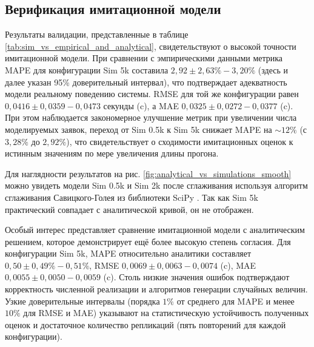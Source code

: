 \documentclass[12pt,a4paper]{article}
\begin{document}
\subsection{Верификация имитационной модели}

Результаты валидации, представленные в таблице \ref{tab:sim_vs_empirical_and_analytical}, свидетельствуют о высокой точности имитационной модели. При сравнении с эмпирическими данными метрика MAPE для конфигурации Sim 5k составила $2,92 \pm 2,63\%-3,20\%$ (здесь и далее указан 95\% доверительный интервал), что подтверждает адекватность модели реальному поведению системы. RMSE для той же конфигурации равен $0,0416 \pm 0,0359-0,0473$ секунды (c), а MAE $0,0325 \pm 0,0272-0,0377$ (c). При этом наблюдается закономерное улучшение метрик при увеличении числа моделируемых заявок, переход от Sim 0.5k к Sim 5k снижает MAPE на $\sim12\%$ (с $3,28\%$ до $2,92\%$), что свидетельствует о сходимости имитационных оценок к истинным значениям по мере увеличения длины прогона.

Для наглядности результатов на рис. \ref{fig:analytical_vs_simulations_smooth} можно увидеть модели Sim 0.5k и Sim 2k после сглаживания используя алгоритм сглаживания Савицкого-Голея \cite{savitzky1964smoothing} из библиотеки SciPy \cite{virtanen2020scipy}. Так как Sim 5k практический совпадает с аналитической кривой, он не отображен.

Особый интерес представляет сравнение имитационной модели с аналитическим решением, которое демонстрирует ещё более высокую степень согласия. Для конфигурации Sim 5k, MAPE относительно аналитики составляет $0,50 \pm 0,49\% -0,51\%$, RMSE $0,0069 \pm 0,0063 -0,0074$ (c), MAE $0,0055 \pm 0,0050 -0,0059$ (c). Столь низкие значения ошибок подтверждают корректность численной реализации и алгоритмов генерации случайных величин. Узкие доверительные интервалы (порядка $1\%$ от среднего для MAPE и менее $10\%$ для RMSE и MAE) указывают на статистическую устойчивость полученных оценок и достаточное количество репликаций (пять повторений для каждой конфигурации).
\end{document}
